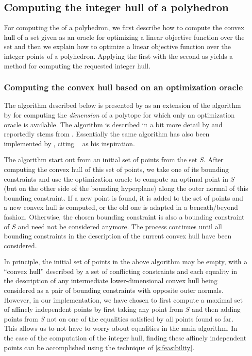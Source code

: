 \subsection{Computing the integer hull of a polyhedron}
\label{s:integer:hull}

For computing the  of a polyhedron,
we first describe how to compute the convex hull of a set
given as an oracle for optimizing a linear objective
function over the set and then
we explain how to optimize a linear objective function over
the integer points of a polyhedron.
Applying the first with the second as 
yields a method for computing the requested integer hull.

\subsubsection{Computing the convex hull based on an optimization oracle}

The algorithm described below is presented by
 as an extension of the
algorithm by  for computing
the {\em dimension} of a polytope for which only an optimization oracle
is available.  The algorithm is described in a bit more detail
by  and reportedly stems from
.
Essentially the same algorithm has also been implemented
by , citing
~ as his inspiration.

The algorithm start out from an initial set of points from
the set $S$.  After computing the convex hull of this set
of points, we take one of its bounding constraints and use
the optimization oracle
to compute an optimal point in $S$ (but on the other side
of the bounding hyperplane) along the
outer normal of this bounding constraint.
If a new point is found, it is added to the set of points
and a new convex hull is computed, or the old one is adapted
in a beneath/beyond fashion.  Otherwise, the chosen bounding constraint
is also a bounding constraint of $S$ and need not be considered anymore.
The process continues until all bounding constraints in the
description of the current convex hull have been considered.

In principle, the initial set of points in the above algorithm
may be empty, with a ``convex hull'' described by a set of
conflicting constraints and each equality in the description of any
intermediate lower-dimensional convex hull being considered
as a pair of bounding constraints with opposite outer normals.
However, in our implementation, we have chosen to first compute
a maximal set of affinely independent points by first taking any
point from $S$ and then adding points from $S$ not on one of
the equalities satisfied by all points found so far.
This allows us to not have to worry about equalities in the
main algorithm.
In the case of the computation of the integer hull, finding
these affinely independent points can be accomplished using the technique of
\autoref{s:feasibility}.


